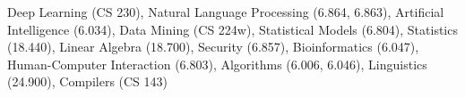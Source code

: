 
Deep Learning (CS 230), Natural Language Processing (6.864, 6.863), Artificial Intelligence (6.034), Data Mining (CS 224w), Statistical Models (6.804), Statistics (18.440), Linear Algebra (18.700), Security (6.857), Bioinformatics (6.047), Human-Computer Interaction (6.803), Algorithms (6.006, 6.046), Linguistics (24.900), Compilers (CS 143)\\